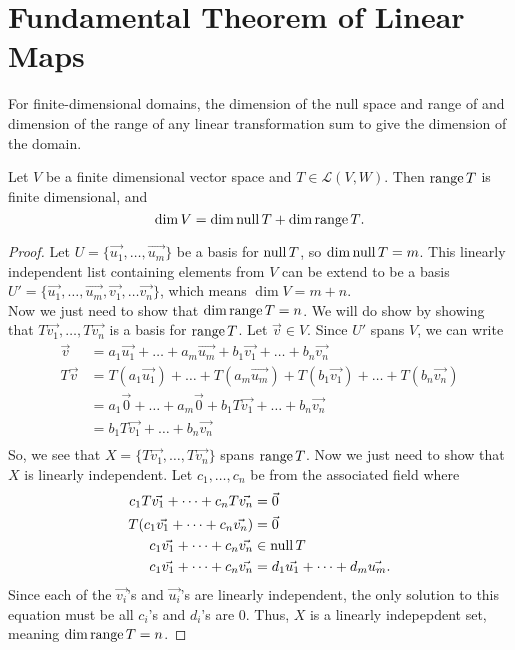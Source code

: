 \section{Fundamental Theorem of Linear Maps}

For finite-dimensional domains, the dimension of the null space and range of and dimension of the range of any linear transformation sum to give the dimension of the domain.
\begin{theorem}
	Let $V$ be a finite dimensional vector space and $T \in \mathcal{L}(V,W)$.
	Then $\operatorname{range}{T}$ is finite dimensional, and
	\begin{equation*}
		\dim{V} = \dim{\operatorname{null}{T}} + \dim{\operatorname{range}{T}}.
	\end{equation*}
\end{theorem}
\begin{proof}
	Let $U = \{ \vec{u_1}, \dots, \vec{u_m} \}$ be a basis for $\operatorname{null}{T}$, so $\dim{\operatorname{null}{T}} = m$.
	This linearly independent list containing elements from $V$ can be extend to be a basis $U' = \{\vec{u_1}, \dots, \vec{u_m}, \vec{v_1}, \dots \vec{v_n}\}$, which means $\dim{V} = m+n$. \\
	
	Now we just need to show that $\dim{\operatorname{range}{T}} = n$.
	We will do show by showing that $T\vec{v_1}, \dots, T\vec{v_n}$ is a basis for $\operatorname{range}{T}$.
	Let $\vec{v} \in V$.
	Since $U'$ spans $V$, we can write
	\begin{align*}
		\vec{v} &= a_1\vec{u_1} + \dots + a_m\vec{u_m} + b_1\vec{v_1} + \dots + b_n\vec{v_n} \\
		T\vec{v} &= T(a_1\vec{u_1}) + \dots + T(a_m\vec{u_m}) + T(b_1\vec{v_1}) + \dots + T(b_n\vec{v_n}) \\
			&= a_1\vec{0} + \dots + a_m\vec{0} + b_1T\vec{v_1} + \dots + b_n\vec{v_n} \\
			&= b_1T\vec{v_1} + \dots + b_n\vec{v_n} \\
	\end{align*}
	So, we see that $X = \{T\vec{v_1}, \dots, T\vec{v_n}\}$ spans $\operatorname{range}{T}$.
	Now we just need to show that $X$ is linearly independent.
	Let $c_1, \dots, c_n$ be from the associated field where
	\begin{align*}
		c_1T\vec{v_1} + \dots + c_nT\vec{v_n} &= \vec{0} \\
		T(c_1\vec{v_1} + \dots + c_n\vec{v_n}) &= \vec{0} \\
		c_1\vec{v_1} + \dots + c_n\vec{v_n} &\in \operatorname{null}{T} \\
		c_1\vec{v_1} + \dots + c_n\vec{v_n} &= d_1\vec{u_1} + \dots + d_m\vec{u_m}.
	\end{align*}
	Since each of the $\vec{v_i}$'s and $\vec{u_i}$'s are linearly independent, the only solution to this equation must be all $c_i$'s and $d_i$'s are 0.
	Thus, $X$ is a linearly indepepdent set, meaning $\dim{\operatorname{range}{T}} = n$.
\end{proof}

